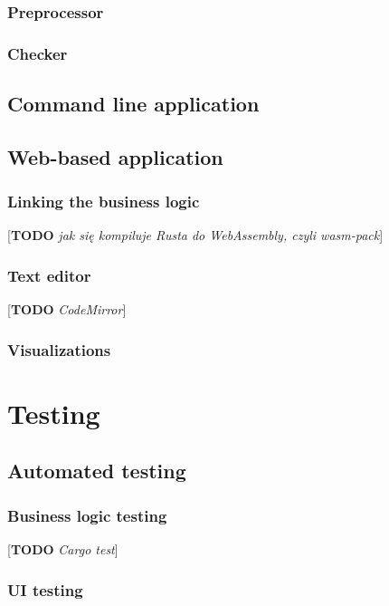 \documentclass[english,engineering]{wizthesis}
\newcommand{\todo}[1]{{\color{red}[\textbf{TODO} \textit{#1}]}}
\begin{document}
\subsection{Preprocessor}

\subsection{Checker}

\section{Command line application}

\section{Web-based application}

\subsection{Linking the business logic}

\todo{jak się kompiluje Rusta do WebAssembly, czyli wasm-pack}

\subsection{Text editor}

\todo{CodeMirror}

\subsection{Visualizations}

\chapter{Testing}

\section{Automated testing}

\subsection{Business logic testing}

\todo{Cargo test}

\subsection{UI testing}
\end{document}
